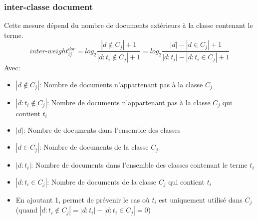 \documentclass{article}
\begin{document}
\subsubsection*{inter-classe document}
Cette mesure dépend du nombre de documents extérieurs à la classe contenant le terme.
\[ inter\mbox{-}weight_{ij}^{doc} = log_2 \frac{|d \notin{C_j}|+1}{|d:t_i \notin{C_j}|+1}= log_2 \frac{|d|-|d \in{C_j}|+1}{|d:t_i|-|d:t_i \in{C_j}|+1}\]
 Avec:
\begin{itemize}
	\item $|d \notin  {C_j}|$: Nombre de documents n'appartenant pas à la classe $C_j$
	\item $|d:t_i \notin {C_j}|$: Nombre de documents n'appartenant pas à la classe $C_j$ qui contient $t_i$ 
	\item $|d|$: Nombre de documents dans l'ensemble des classes
	\item $|d \in  {C_j}|$: Nombre de documents de la classe $C_j$
	\item $|d:t_i|$: Nombre de documents dans l'ensemble des classes contenant le terme $t_i$ 
	\item $|d:t_i \in {C_j}|$: Nombre de documents de la classe $C_j$ qui contient $t_i$ 
	\item En ajoutant 1, permet de prévenir le cas où $t_i$ est uniquement utilisé dans $C_j$ (quand $|d:t_i \notin{C_j}|={|d:t_i|-|d:t_i \in{C_j}|} = 0$)
  \end{itemize}
\end{document}
